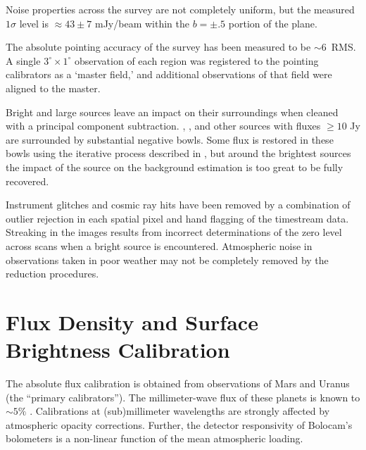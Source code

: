 \documentclass[12pt,preprint]{aastex}
\begin{document}
Noise properties across the survey are not completely uniform, but the
measured $1\sigma$ level is $\approx43\pm7$ mJy/beam within the
$b=\pm.5$ portion of the plane.

The absolute pointing accuracy of the survey has been measured to be
$\sim$6\arcsec\ RMS.  A single $3^\circ \times 1^\circ$ observation of
each region was registered to the pointing calibrators as a `master
field,' and additional observations of that field were aligned to the
master.

Bright and large sources leave an impact on their surroundings when
cleaned with a principal component subtraction.  ,
, and other sources with fluxes $\geq 10$ Jy are
surrounded by substantial negative bowls.  Some flux is restored in
these bowls using the iterative process described in
\citet{Aguirre2009}, but around the brightest sources the impact of
the source on the background estimation is too great to be fully
recovered.

Instrument glitches and cosmic ray hits have been removed by a
combination of outlier rejection in each spatial pixel and hand
flagging of the timestream data.  Streaking in the images results from
incorrect determinations of the zero level across scans when a bright
source is encountered.  Atmospheric noise in observations taken in
poor weather may not be completely removed by the reduction
procedures.

\section{Flux Density and Surface Brightness Calibration}
\label{sec:FluxCalibration}

The absolute flux calibration is obtained from observations of Mars
and Uranus
(the ``primary calibrators'').  The millimeter-wave flux of these
planets is known to $\sim 5\%$ \citep{orton86,griffin93}.
Calibrations at (sub)millimeter wavelengths are strongly affected by
atmospheric opacity corrections.  Further, the detector responsivity
of Bolocam's bolometers is a non-linear function of the mean
atmospheric loading.
\end{document}
